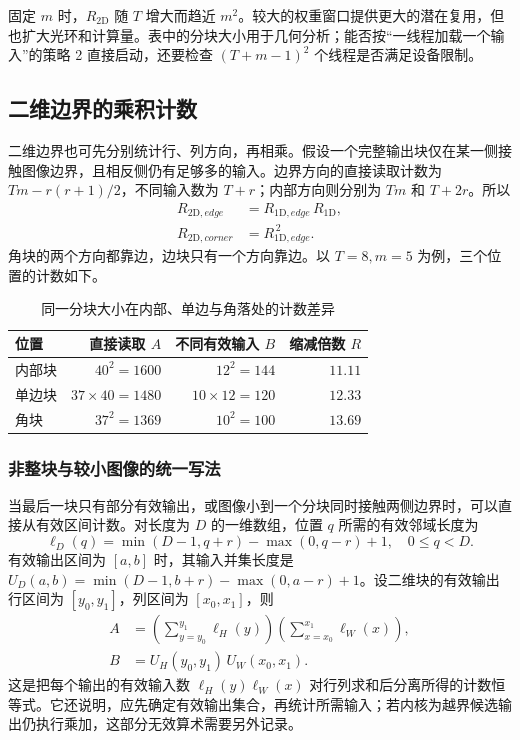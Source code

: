 固定 $m$ 时，$R_{2\mathrm D}$ 随 $T$ 增大而趋近 $m^2$。较大的权重窗口提供更大的潜在复用，但也扩大光环和计算量。表中的分块大小用于几何分析；能否按“一线程加载一个输入”的策略 2 直接启动，还要检查 $(T+m-1)^2$ 个线程是否满足设备限制。

\subsection{二维边界的乘积计数}
\label{l9:subsec:boundary-product}
二维边界也可先分别统计行、列方向，再相乘。假设一个完整输出块仅在某一侧接触图像边界，且相反侧仍有足够多的输入。边界方向的直接读取计数为 $Tm-r(r+1)/2$，不同输入数为 $T+r$；内部方向则分别为 $Tm$ 和 $T+2r$。所以
\begin{equation}
 \begin{aligned}
 R_{2\mathrm D,edge}&=R_{1\mathrm D,edge}\,R_{1\mathrm D},\\
 R_{2\mathrm D,corner}&=R_{1\mathrm D,edge}^{\,2}.
 \end{aligned}
 \label{l9:eq:boundary2d-product}
\end{equation}
角块的两个方向都靠边，边块只有一个方向靠边。以 $T=8,m=5$ 为例，三个位置的计数如下。

\begin{table}[htbp]
\centering\small
\caption{同一分块大小在内部、单边与角落处的计数差异}
\label{l9:tab:boundary2d}
\begin{tabular}{@{}lrrr@{}}\toprule
位置 & 直接读取 $A$ & 不同有效输入 $B$ & 缩减倍数 $R$\\\midrule
内部块 & $40^2=1600$ & $12^2=144$ & $11.11$\\
单边块 & $37\times40=1480$ & $10\times12=120$ & $12.33$\\
角块 & $37^2=1369$ & $10^2=100$ & $13.69$\\\bottomrule
\end{tabular}
\end{table}

\subsubsection{非整块与较小图像的统一写法}
当最后一块只有部分有效输出，或图像小到一个分块同时接触两侧边界时，可以直接从有效区间计数。对长度为 $D$ 的一维数组，位置 $q$ 所需的有效邻域长度为
\begin{equation}
 \ell_D(q)=\min(D-1,q+r)-\max(0,q-r)+1,
 \quad 0\le q<D.
 \label{l9:eq:valid-neighborhood}
\end{equation}
有效输出区间为 $[a,b]$ 时，其输入并集长度是 $U_D(a,b)=\min(D-1,b+r)-\max(0,a-r)+1$。设二维块的有效输出行区间为 $[y_0,y_1]$，列区间为 $[x_0,x_1]$，则
\begin{equation}
 \begin{aligned}
 A&=\left(\sum_{y=y_0}^{y_1}\ell_H(y)\right)
     \left(\sum_{x=x_0}^{x_1}\ell_W(x)\right),\\
 B&=U_H(y_0,y_1)\,U_W(x_0,x_1).
 \end{aligned}
 \label{l9:eq:boundary-general}
\end{equation}
这是把每个输出的有效输入数 $\ell_H(y)\ell_W(x)$ 对行列求和后分离所得的计数恒等式。它还说明，应先确定有效输出集合，再统计所需输入；若内核为越界候选输出仍执行乘加，这部分无效算术需要另外记录。
\FloatBarrier
